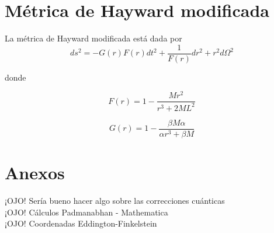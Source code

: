 \documentclass[prb,aps,preprintnumbers,amsmath,amssymb]{article}
\numberwithin{equation}{section}
\begin{document}
\section{Métrica de Hayward modificada}

La métrica de Hayward modificada está dada por 
\begin{equation}
\label{reg-sch}
ds^2 = -G(r)F(r) dt^2 + \frac{1}{F(r)} dr^2 + r^2d\Omega ^2
\end{equation}

donde

\begin{equation}
\label{mod-hay-f}
F(r) = 1 - \frac{Mr^2}{r^3 + 2ML^2}
\end{equation}

\begin{equation}
\label{mod-hay-g}
G(r) = 1 - \frac{\beta M \alpha}{\alpha r^3 + \beta M}
\end{equation}

\section{Anexos}

¡OJO! Sería bueno hacer algo sobre las correcciones cuánticas\\

¡OJO! Cálculos Padmanabhan - Mathematica\\

¡OJO! Coordenadas Eddington-Finkelstein\\
\end{document}
